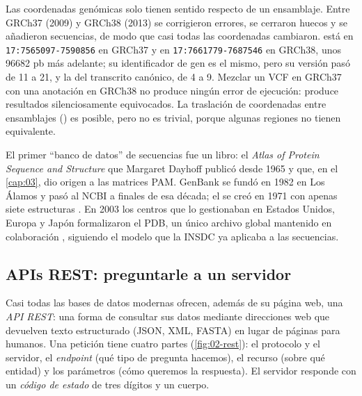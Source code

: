 Las coordenadas genómicas solo tienen sentido respecto de un ensamblaje. Entre GRCh37 (2009) y GRCh38 (2013) se corrigieron errores, se cerraron huecos y se añadieron secuencias, de modo que casi todas las coordenadas cambiaron.  está en \texttt{17:7565097-7590856} en GRCh37 y en \texttt{17:7661779-7687546} en GRCh38, unos \num{96682} pb más adelante; su identificador de gen es el mismo, pero su versión pasó de 11 a 21, y la del transcrito canónico, de 4 a 9. Mezclar un VCF en GRCh37 con una anotación en GRCh38 no produce ningún error de ejecución: produce resultados silenciosamente equivocados. La traslación de coordenadas entre ensamblajes () es posible, pero no es trivial, porque algunas regiones no tienen equivalente.

\begin{historia}
El primer ``banco de datos'' de secuencias fue un libro: el \emph{Atlas of Protein Sequence and Structure} que Margaret Dayhoff publicó desde 1965 y que, en el \cref{cap:03}, dio origen a las matrices PAM. GenBank se fundó en 1982 en Los Álamos y pasó al NCBI a finales de esa década; el  se creó en 1971 con apenas siete estructuras \parencite{c02-berman2000}. En 2003 los centros que lo gestionaban en Estados Unidos, Europa y Japón formalizaron el  PDB, un único archivo global mantenido en colaboración \parencite{c02-berman2003}, siguiendo el modelo que la INSDC ya aplicaba a las secuencias.
\end{historia}

\subsection{APIs REST: preguntarle a un servidor}

Casi todas las bases de datos modernas ofrecen, además de su página web, una \emph{API REST}: una forma de consultar sus datos mediante direcciones web que devuelven texto estructurado (JSON, XML, FASTA) en lugar de páginas para humanos. Una petición tiene cuatro partes (\cref{fig:02-rest}): el protocolo y el servidor, el \emph{endpoint} (qué tipo de pregunta hacemos), el recurso (sobre qué entidad) y los parámetros (cómo queremos la respuesta). El servidor responde con un \emph{código de estado} de tres dígitos y un cuerpo.

